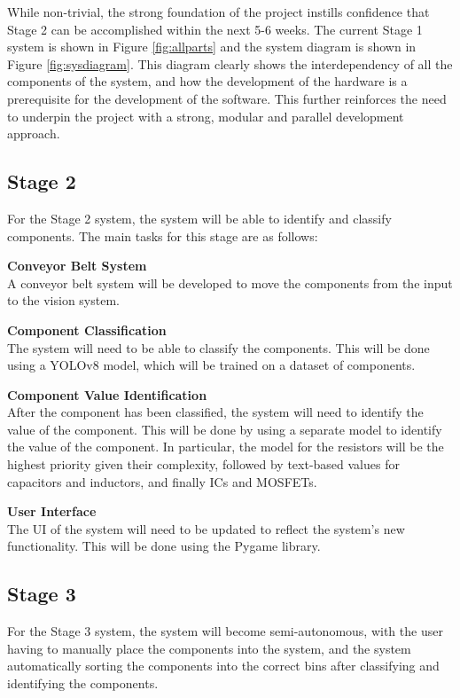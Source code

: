 While non-trivial, the strong foundation of the project instills confidence that Stage 2 can be accomplished within the next 5-6 weeks.
The current Stage 1 system is shown in Figure \ref{fig:allparts} and the system diagram is shown in Figure \ref{fig:sysdiagram}.
This diagram clearly shows the interdependency of all the components of the system, and how the development of the hardware is a prerequisite for the development of the software.
This further reinforces the need to underpin the project with a strong, modular and parallel development approach.

\subsection{Stage 2}
For the Stage 2 system, the system will be able to identify and classify components. 
The main tasks for this stage are as follows:
\begin{mylist}
    \item \textbf{Conveyor Belt System} \\
    A conveyor belt system will be developed to move the components from the input to the vision system.
    \item \textbf{Component Classification} \\
    The system will need to be able to classify the components. This will be done using a YOLOv8 model, which will be trained on a dataset of components.
    \item \textbf{Component Value Identification} \\
    After the component has been classified, the system will need to identify the value of the component. This will be done by using
    a separate model to identify the value of the component. In particular, the model for the resistors will be the highest
    priority given their complexity, followed by text-based values for capacitors and inductors, and finally ICs and MOSFETs.
    \item \textbf{User Interface} \\
    The UI of the system will need to be updated to reflect the system's new functionality. This will be done using the Pygame library\cite{pygamedoc}.
\end{mylist}

\subsection{Stage 3}
For the Stage 3 system, the system will become semi-autonomous, with the user having to manually place the components into the system, and the system
automatically sorting the components into the correct bins after classifying and identifying the components. 

